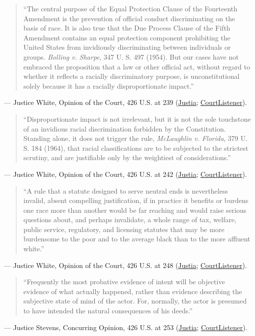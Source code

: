 \documentclass[12pt]{article}
\begin{document}
\begin{quote}
``The central purpose of the Equal Protection Clause of the Fourteenth Amendment is the prevention of official conduct discriminating on the basis of race. It is also true that the Due Process Clause of the Fifth Amendment contains an equal protection component prohibiting the United States from invidiously discriminating between individuals or groups. \textit{Bolling v. Sharpe}, 347 U. S. 497 (1954). But our cases have not embraced the proposition that a law or other official act, without regard to whether it reflects a racially discriminatory purpose, is unconstitutional solely because it has a racially disproportionate impact.''
\end{quote}
\noindent --- Justice White, Opinion of the Court, 426 U.S. at 239 (\href{https://supreme.justia.com/cases/federal/us/426/229/}{Justia}; \href{https://www.courtlistener.com/opinion/109469/washington-v-davis/}{CourtListener}).

\begin{quote}
``Disproportionate impact is not irrelevant, but it is not the sole touchstone of an invidious racial discrimination forbidden by the Constitution. Standing alone, it does not trigger the rule, \textit{McLaughlin v. Florida}, 379 U. S. 184 (1964), that racial classifications are to be subjected to the strictest scrutiny, and are justifiable only by the weightiest of considerations.''
\end{quote}
\noindent --- Justice White, Opinion of the Court, 426 U.S. at 242 (\href{https://supreme.justia.com/cases/federal/us/426/229/}{Justia}; \href{https://www.courtlistener.com/opinion/109469/washington-v-davis/}{CourtListener}).

\begin{quote}
``A rule that a statute designed to serve neutral ends is nevertheless invalid, absent compelling justification, if in practice it benefits or burdens one race more than another would be far reaching and would raise serious questions about, and perhaps invalidate, a whole range of tax, welfare, public service, regulatory, and licensing statutes that may be more burdensome to the poor and to the average black than to the more affluent white.''
\end{quote}
\noindent --- Justice White, Opinion of the Court, 426 U.S. at 248 (\href{https://supreme.justia.com/cases/federal/us/426/229/}{Justia}; \href{https://www.courtlistener.com/opinion/109469/washington-v-davis/}{CourtListener}).

\begin{quote}
``Frequently the most probative evidence of intent will be objective evidence of what actually happened, rather than evidence describing the subjective state of mind of the actor. For, normally, the actor is presumed to have intended the natural consequences of his deeds.''
\end{quote}
\noindent --- Justice Stevens, Concurring Opinion, 426 U.S. at 253 (\href{https://supreme.justia.com/cases/federal/us/426/229/}{Justia}; \href{https://www.courtlistener.com/opinion/109469/washington-v-davis/}{CourtListener}).
\end{document}
